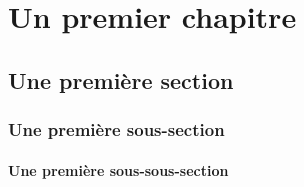 

\begin{comment}

\documentclass[a4paper, 11pt, twoside, fleqn]{memoir}

\usepackage{AOCDTF}



	\openleft %

\end{comment}

	\chapter{Un premier  chapitre}
	\ChapFrame %

	\section{Une première section}
	\lipsum[1]

	\subsection{Une première sous-section}
	\lipsum[1-3]

	\subsubsection{Une première sous-sous-section}
	\lipsum[1-2]

%

